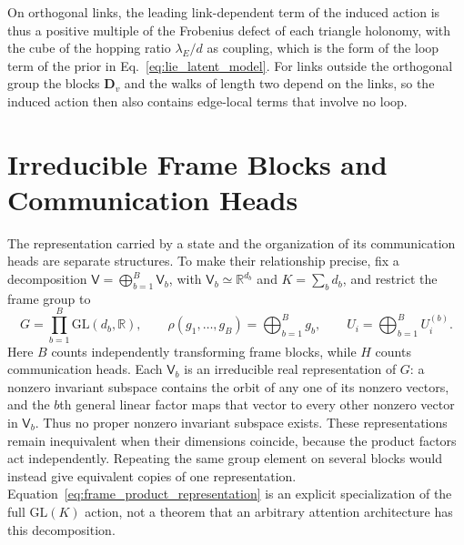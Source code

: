 \documentclass[twoside,11pt]{article}
\begin{document}
On orthogonal links, the leading link-dependent term of the induced action is thus a positive multiple of the Frobenius defect of each triangle holonomy, with the cube of the hopping ratio $\lambda_E/d$ as coupling, which is the form of the loop term of the prior in Eq.~\eqref{eq:lie_latent_model}. For links outside the orthogonal group the blocks $\mathbf D_v$ and the walks of length two depend on the links, so the induced action then also contains edge-local terms that involve no loop.

\section{Irreducible Frame Blocks and Communication Heads}
\label{sec:heads_irreps}

The representation carried by a state and the organization of its communication heads are separate structures. To make their relationship precise, fix a decomposition $\mathsf V=\bigoplus_{b=1}^{B}\mathsf V_b$, with $\mathsf V_b\simeq\mathbb R^{d_b}$ and $K=\sum_bd_b$, and restrict the frame group to
\begin{equation}
G=\prod_{b=1}^{B}\mathrm{GL}(d_b,\mathbb R),\qquad
\rho(g_1,\ldots,g_B)=\bigoplus_{b=1}^{B}g_b,\qquad
U_i=\bigoplus_{b=1}^{B}U_i^{(b)}.
\label{eq:frame_product_representation}
\end{equation}
Here $B$ counts independently transforming frame blocks, while $H$ counts communication heads. Each $\mathsf V_b$ is an irreducible real representation of $G$: a nonzero invariant subspace contains the orbit of any one of its nonzero vectors, and the $b$th general linear factor maps that vector to every other nonzero vector in $\mathsf V_b$. Thus no proper nonzero invariant subspace exists. These representations remain inequivalent when their dimensions coincide, because the product factors act independently. Repeating the same group element on several blocks would instead give equivalent copies of one representation. Equation~\eqref{eq:frame_product_representation} is an explicit specialization of the full $\mathrm{GL}(K)$ action, not a theorem that an arbitrary attention architecture has this decomposition.
\end{document}
